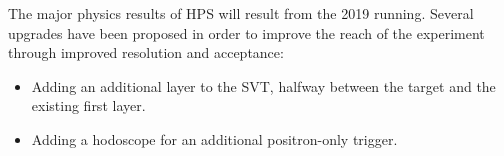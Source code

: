\documentclass[b1]{sciposter}
\begin{document}
\begin{multicols}{3}
        The major physics results of HPS will result from the 2019 running. %
        Several upgrades have been proposed in order to improve the reach of the experiment through improved resolution and acceptance:  
     	\begin{itemize}
	\item Adding an additional layer to the SVT, halfway between the target and the existing first layer.  
	\item Adding a hodoscope for an additional positron-only trigger.  
	\end{itemize}
	
\end{multicols}
\end{document}
